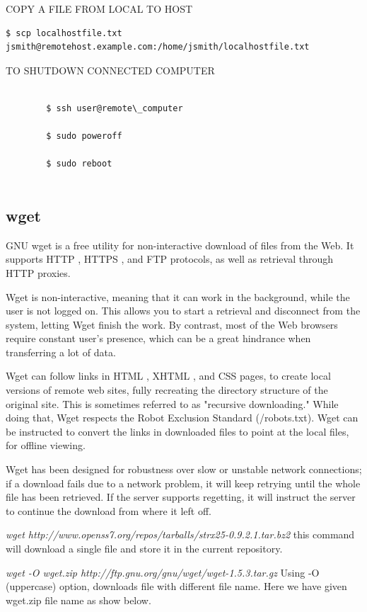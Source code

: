 \documentclass{article}
\begin{document}
COPY A FILE FROM LOCAL TO HOST
\begin{verbatim}
$ scp localhostfile.txt jsmith@remotehost.example.com:/home/jsmith/localhostfile.txt
\end{verbatim}

TO SHUTDOWN CONNECTED COMPUTER 
		\begin{verbatim}

		$ ssh user@remote\_computer
		
		$ sudo poweroff
		
		$ sudo reboot 
		
		\end{verbatim}


\subsection{wget}


GNU wget is a free utility for non-interactive download of files from the Web. It supports HTTP , HTTPS , and FTP protocols, as well as retrieval through HTTP proxies.

Wget is non-interactive, meaning that it can work in the background, while the user is not logged on. This allows you to start a retrieval and disconnect from the system, letting Wget finish the work. By contrast, most of the Web browsers require constant user's presence, which can be a great hindrance when transferring a lot of data.

Wget can follow links in HTML , XHTML , and CSS pages, to create local versions of remote web sites, fully recreating the directory structure of the original site. This is sometimes referred to as "recursive downloading." While doing that, Wget respects the Robot Exclusion Standard (/robots.txt). Wget can be instructed to convert the links in downloaded files to point at the local files, for offline viewing.

Wget has been designed for robustness over slow or unstable network connections; if a download fails due to a network problem, it will keep retrying until the whole file has been retrieved. If the server supports regetting, it will instruct the server to continue the download from where it left off.

\hspace{10mm} \textit{wget http://www.openss7.org/repos/tarballs/strx25-0.9.2.1.tar.bz2} this command will download a single file and store it in the current repository.

\hspace{10mm} \textit{wget -O wget.zip http://ftp.gnu.org/gnu/wget/wget-1.5.3.tar.gz} Using -O (uppercase) option, downloads file with different file name. Here we have given wget.zip file name as show below.
\end{document}
